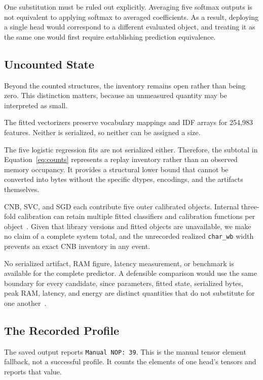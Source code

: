 \documentclass[runningheads]{llncs}
\begin{document}
One substitution must be ruled out explicitly. Averaging five softmax outputs is not equivalent to applying softmax to averaged coefficients. As a result, deploying a single head would correspond to a different evaluated object, and treating it as the same one would first require establishing prediction equivalence.

\subsection{Uncounted State}

Beyond the counted structures, the inventory remains open rather than being zero. This distinction matters, because an unmeasured quantity may be interpreted as small.

The fitted vectorizers preserve vocabulary mappings and IDF arrays for 254,983 features. Neither is serialized, so neither can be assigned a size.

The five logistic regression fits are not serialized either. Therefore, the subtotal in Equation~\ref{eq:counts} represents a replay inventory rather than an observed memory occupancy. It provides a structural lower bound that cannot be converted into bytes without the specific dtypes, encodings, and the artifacts themselves.

CNB, SVC, and SGD each contribute five outer calibrated objects. Internal three-fold calibration can retain multiple fitted classifiers and calibration functions per object~\cite{pedregosa2011scikit}. Given that library versions and fitted objects are unavailable, we make no claim of a complete system total, and the unrecorded realized \texttt{char\_wb} width prevents an exact CNB inventory in any event.

No serialized artifact, RAM figure, latency measurement, or benchmark is available for the complete predictor. A defensible comparison would use the same boundary for every candidate, since parameters, fitted state, serialized bytes, peak RAM, latency, and energy are distinct quantities that do not substitute for one another~\cite{henderson2020systematic}.
\subsection{The Recorded Profile}


The saved output reports \texttt{Manual NOP: 39}. This is the manual tensor element fallback, not a successful profile. It counts the elements of one head’s tensors and reports that value.
\end{document}
